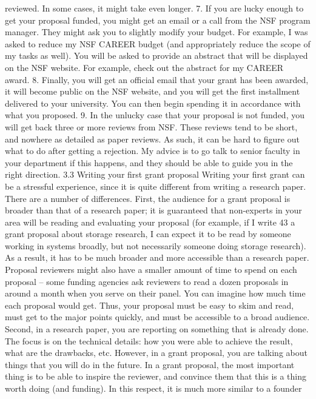 \documentclass[oneside,11pt]{memoir}
\begin{document}
reviewed. In some cases, it might take even longer.
7. If you are lucky enough to get your proposal funded, you might get an email or a call from
the NSF program manager. They might ask you to slightly modify your budget. For
example, I was asked to reduce my NSF CAREER budget (and appropriately reduce the
scope of my tasks as well). You will be asked to provide an abstract that will be displayed
on the NSF website. For example, check out the abstract for my CAREER award.
8. Finally, you will get an official email that your grant has been awarded, it will become
public on the NSF website, and you will get the first installment delivered to your
university. You can then begin spending it in accordance with what you proposed.
9. In the unlucky case that your proposal is not funded, you will get back three or more
reviews from NSF. These reviews tend to be short, and nowhere as detailed as paper
reviews. As such, it can be hard to figure out what to do after getting a rejection. My
advice is to go talk to senior faculty in your department if this happens, and they should
be able to guide you in the right direction.
3.3 Writing your first grant proposal
Writing your first grant can be a stressful experience, since it is quite different from writing a
research paper. There are a number of differences.
First, the audience for a grant proposal is broader than that of a research paper; it is guaranteed
that non-experts in your area will be reading and evaluating your proposal (for example, if I write
43
a grant proposal about storage research, I can expect it to be read by someone working in
systems broadly, but not necessarily someone doing storage research). As a result, it has to be
much broader and more accessible than a research paper. Proposal reviewers might also have a
smaller amount of time to spend on each proposal – some funding agencies ask reviewers to
read a dozen proposals in around a month when you serve on their panel. You can imagine how
much time each proposal would get. Thus, your proposal must be easy to skim and read, must
get to the major points quickly, and must be accessible to a broad audience.
Second, in a research paper, you are reporting on something that is already done. The focus is
on the technical details: how you were able to achieve the result, what are the drawbacks, etc.
However, in a grant proposal, you are talking about things that you will do in the future. In a grant
proposal, the most important thing is to be able to inspire the reviewer, and convince them that
this is a thing worth doing (and funding). In this respect, it is much more similar to a founder
\end{document}
